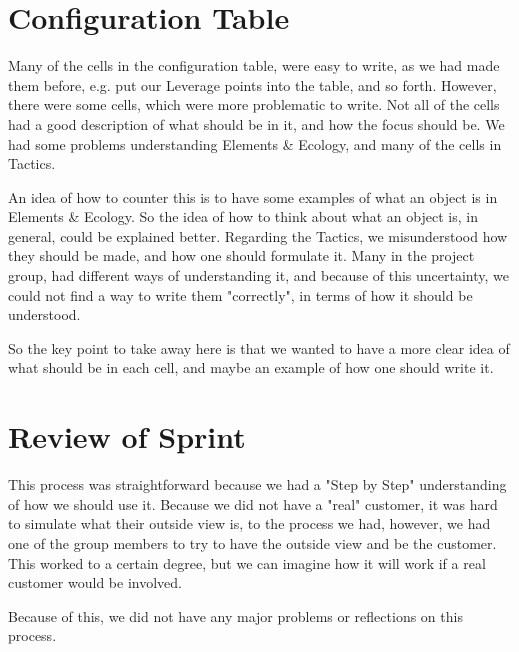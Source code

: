 \section{Configuration Table}
Many of the cells in the configuration table, were easy to write, as we had made them before, e.g. put our Leverage points into the table, and so forth.
However, there were some cells, which were more problematic to write.
Not all of the cells had a good description of what should be in it, and how the focus should be.
We had some problems understanding Elements \& Ecology, and many of the cells in Tactics.

An idea of how to counter this is to have some examples of what an object is in Elements \& Ecology.
So the idea of how to think about what an object is, in general, could be explained better. 
Regarding the Tactics, we misunderstood how they should be made, and how one should formulate it.
Many in the project group, had different ways of understanding it, and because of this uncertainty, we could not find a way to write them "correctly", in terms of how it should be understood.

So the key point to take away here is that we wanted to have a more clear idea of what should be in each cell, and maybe an example of how one should write it.

\section{Review of Sprint}
This process was straightforward because we had a "Step by Step" understanding of how we should use it.
Because we did not have a "real" customer, it was hard to simulate what their outside view is, to the process we had, however, we had one of the group members to try to have the outside view and be the customer.
This worked to a certain degree, but we can imagine how it will work if a real customer would be involved.

Because of this, we did not have any major problems or reflections on this process.
